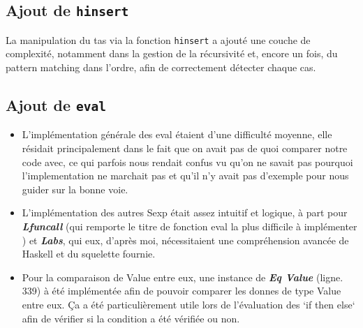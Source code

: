\documentclass[12pt]{article}
\begin{document}
\subsection{Ajout de \texttt{hinsert}}
La manipulation du tas via la fonction \texttt{hinsert} a ajouté une couche de complexité, notamment dans la gestion de la récursivité et, encore un fois, du pattern matching dans l'ordre, afin de correctement détecter chaque cas.

\subsection{Ajout de \texttt{eval}}
\begin{itemize}
    \item L'implémentation générale des eval étaient d'une difficulté moyenne, elle résidait principalement dans le fait que on avait pas de quoi comparer notre code avec, ce qui parfois nous rendait confus vu qu'on ne savait pas pourquoi l'implementation ne marchait pas et qu'il n'y avait pas d'exemple pour nous guider sur la bonne voie.
    \item L'implémentation des autres Sexp était assez intuitif et logique, à part pour \textbf{\textit{Lfuncall}} (qui remporte le titre de fonction eval la plus difficile à implémenter ) et \textbf{\textit{Labs}}, qui eux, d'après moi, nécessitaient une compréhension avancée de Haskell et du squelette fournie.
    \item Pour la comparaison de Value entre eux, une instance de \textbf{\textit{Eq Value}} (ligne. 339) à été implémentée afin de pouvoir comparer les donnes de type Value entre eux. Ça a été particulièrement utile lors de l'évaluation des `if then else` afin de vérifier si la condition a été vérifiée ou non.
\end{itemize}
\end{document}
